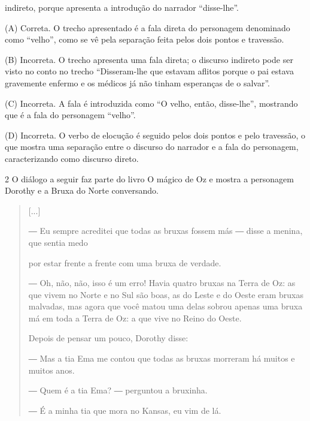 \begin{escolha}
\begin{escolha}
{\begin{escolha}
\begin{escolha}
\item indireto, porque apresenta a introdução do narrador ``disse-lhe''.
\end{escolha}


(A) Correta. O trecho apresentado é a fala direta do personagem
denominado como ``velho'', como se vê pela separação feita pelos dois
pontos e travessão.

(B) Incorreta. O trecho apresenta uma fala direta; o discurso indireto
pode ser visto no conto no trecho ``Disseram-lhe que estavam aflitos
porque o pai estava gravemente enfermo e os médicos já não tinham
esperanças de o salvar''.

(C) Incorreta. A fala é introduzida como ``O velho, então, disse-lhe'',
mostrando que é a fala do personagem ``velho''.

(D) Incorreta. O verbo de elocução é seguido pelos dois pontos e pelo
travessão, o que mostra uma separação entre o discurso do narrador e a
fala do personagem, caracterizando como discurso direto.

\num{2} O diálogo a seguir faz parte do livro O mágico de Oz e mostra a
personagem Dorothy e a Bruxa do Norte conversando.


\begin{quote}
{[}...{]}

― Eu sempre acreditei que todas as bruxas fossem más ― disse a menina,
que sentia medo

por estar frente a frente com uma bruxa de verdade.

― Oh, não, não, isso é um erro! Havia quatro bruxas na Terra de Oz: as
que vivem no Norte e no Sul são boas, as do Leste e do Oeste eram bruxas
malvadas, mas agora que você matou uma delas sobrou apenas uma bruxa má
em toda a Terra de Oz: a que vive no Reino do Oeste.

Depois de pensar um pouco, Dorothy disse:

― Mas a tia Ema me contou que todas as bruxas morreram há muitos e
muitos anos.

― Quem é a tia Ema? ― perguntou a bruxinha.

― É a minha tia que mora no Kansas, eu vim de lá.
\end{quote}


\end{escolha}}
\end{escolha}
\end{escolha}
